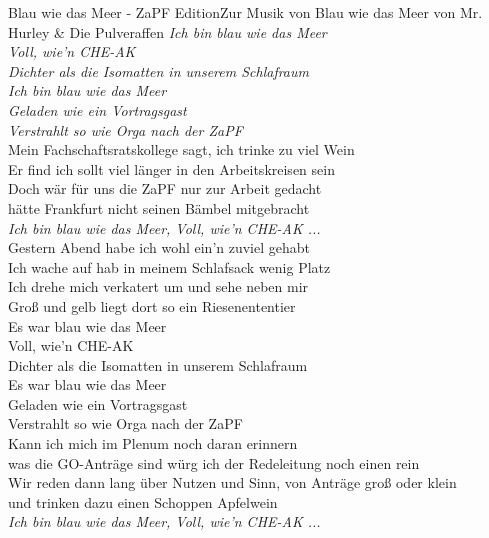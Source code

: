 
\begin{lied} {Blau wie das Meer - ZaPF Edition}{Zur Musik von Blau wie das Meer von Mr. Hurley \& Die Pulveraffen}
\textit{Ich bin blau wie das Meer\\
Voll, wie'n CHE-AK\\
Dichter als die Isomatten in unserem Schlafraum\\
Ich bin blau wie das Meer\\
Geladen wie ein Vortragsgast\\
Verstrahlt so wie Orga nach der ZaPF}\\

Mein Fachschaftsratskollege sagt, ich trinke zu viel Wein \\
Er find ich sollt viel länger in den Arbeitskreisen sein \\
Doch wär für uns die ZaPF nur zur Arbeit gedacht \\
hätte Frankfurt nicht seinen Bämbel mitgebracht \\

\textit{Ich bin blau wie das Meer, Voll, wie'n CHE-AK ...} \\

Gestern Abend habe ich wohl ein'n zuviel gehabt \\
Ich wache auf hab in meinem Schlafsack wenig Platz \\
Ich drehe mich verkatert um und sehe neben mir \\
Groß und gelb liegt dort so ein Riesenententier \\

Es war blau wie das Meer \\
Voll, wie'n CHE-AK \\
Dichter als die Isomatten in unserem Schlafraum \\
Es war blau wie das Meer \\
Geladen wie ein Vortragsgast \\
Verstrahlt so wie Orga nach der ZaPF \\
Kann ich mich im Plenum noch daran erinnern \\
was die GO-Anträge sind würg ich der Redeleitung noch einen rein \\
Wir reden dann lang über Nutzen und Sinn, von Anträge groß oder klein \\
und trinken dazu einen Schoppen Apfelwein \\

\textit{Ich bin blau wie das Meer, Voll, wie'n CHE-AK ...}
\end{lied}
